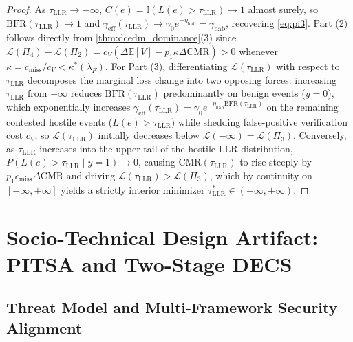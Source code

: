 \documentclass[11pt,a4paper]{article}
\begin{document}
\begin{proof}
As $\tau_{\text{LLR}} \to -\infty$, $C(e) = \mathbb{I}(L(e) > \tau_{\text{LLR}}) \to 1$ almost surely, so $\text{BFR}(\tau_{\text{LLR}}) \to 1$ and $\gamma_{\text{eff}}(\tau_{\text{LLR}}) \to \gamma_0 e^{-\eta_{\text{hab}}} = \gamma_{\text{hab}}$, recovering \cref{eq:pi3}. Part (2) follows directly from \cref{thm:dcedm_dominance}(3) since $\mathcal{L}(\Pi_4) - \mathcal{L}(\Pi_2) = c_V (\Delta\mathbb{E}[V] - p_1 \kappa \Delta\text{CMR}) > 0$ whenever $\kappa = c_{\text{miss}}/c_V < \kappa^*(\lambda_F)$. For Part (3), differentiating $\mathcal{L}(\tau_{\text{LLR}})$ with respect to $\tau_{\text{LLR}}$ decomposes the marginal loss change into two opposing forces: increasing $\tau_{\text{LLR}}$ from $-\infty$ reduces $\text{BFR}(\tau_{\text{LLR}})$ predominantly on benign events ($y=0$), which exponentially increases $\gamma_{\text{eff}}(\tau_{\text{LLR}}) = \gamma_0 e^{-\eta_{\text{hab}}\text{BFR}(\tau_{\text{LLR}})}$ on the remaining contested hostile events ($L(e) > \tau_{\text{LLR}}$) while shedding false-positive verification cost $c_V$, so $\mathcal{L}(\tau_{\text{LLR}})$ initially decreases below $\mathcal{L}(-\infty) = \mathcal{L}(\Pi_3)$. Conversely, as $\tau_{\text{LLR}}$ increases into the upper tail of the hostile LLR distribution, $P(L(e) > \tau_{\text{LLR}} \mid y=1) \to 0$, causing $\text{CMR}(\tau_{\text{LLR}})$ to rise steeply by $p_1 c_{\text{miss}} \Delta\text{CMR}$ and driving $\mathcal{L}(\tau_{\text{LLR}}) > \mathcal{L}(\Pi_3)$, which by continuity on $[-\infty, +\infty]$ yields a strictly interior minimizer $\tau^*_{\text{LLR}} \in (-\infty, +\infty)$.
\end{proof}

\section{Socio-Technical Design Artifact: PITSA and Two-Stage DECS}
\label{sec:artifact}

\subsection{Threat Model and Multi-Framework Security Alignment}
\label{subsec:threat_model}
\end{document}
